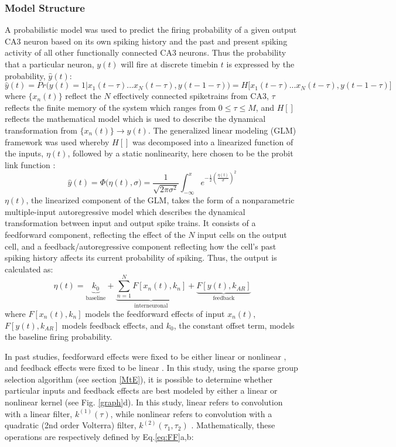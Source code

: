 \documentclass[11pt,a4paper,final]{article}
\begin{document}
\subsubsection{Model Structure \label{MtC}}
A probabilistic model was used to predict the firing probability of a given output CA3 neuron based on its own spiking history and the past and present spiking activity of all other functionally connected CA3 neurons.
Thus the probability that a particular neuron, $y(t)$ will fire at discrete timebin $t$ is expressed by the probability, $\hat{y}(t)$:
\begin{equation}
\hat{y}(t)=Pr\Big(y(t)=1|x_1(t-\tau)...x_{N}(t-\tau),y(t-1-\tau)\Big)=H\Big[x_1(t-\tau)...x_{N}(t-\tau),y(t-1-\tau)\Big]
\label{eq:prob}
\end{equation}
where $\{x_n(t)\}$ reflect the $N$ effectively connected spiketrains from CA3, $\tau$ reflects the finite memory of the system which ranges from $0 \leq \tau \leq M$, and $H[]$ reflects the mathematical model which is used to describe the dynamical transformation from $\{x_n(t)\}\to y(t)$.
The generalized linear modeling (GLM) framework was used whereby $H[]$ was decomposed into a linearized function of the inputs, $\eta(t)$, followed by a static nonlinearity, here chosen to be the probit link function \citep{truccolo05,song07}:
\begin{equation}
\hat{y}(t)=\Phi\Big(\eta(t),\sigma\Big)=\frac{1}{\sqrt{2\pi\sigma^2}}\int_{-\infty}^xe^{-\frac{1}{2}(\frac{\eta(t)}{\sigma})^2}
\label{eq:GLM}
\end{equation}
$\eta(t)$, the linearized component of the GLM, takes the form of a nonparametric multiple-input autoregressive model which describes the dynamical transformation between input and output spike trains.
It consists of a feedforward component, reflecting the effect of the $N$ input cells on the output cell, and a feedback/autoregressive component reflecting how the cell's past spiking history affects its current probability of spiking. Thus, the output is calculated as:
\begin{equation}
\eta(t)=\underbrace{k_0}_\text{baseline}+\underbrace{\sum_{n=1}^{N}F[x_n(t),k_n]}_\text{interneuronal}+
\underbrace{F[y(t),k_{AR}]}_\text{feedback}
\label{eq:MVAR}
\end{equation}
where $F[x_n(t),k_n]$ models the feedforward effects of input $x_n(t)$, $F[y(t),k_{AR}]$ models feedback effects, and $k_0$, the constant offset term, models the baseline firing probability.

In past studies, feedforward effects were fixed to be either linear \citep{sandler14} or nonlinear \citep{sandler15,song07}, and feedback effects were fixed to be linear \citep{song07}.
In this study, using the sparse group selection algorithm (see section \ref{MtE}), it is possible to determine whether particular inputs and feedback effects are best modeled by either a linear or nonlinear kernel (see Fig. \ref{graph}d).
In this study, linear refers to convolution with a linear filter, $k^{(1)}(\tau)$, while nonlinear refers to convolution with a quadratic (2nd order Volterra) filter, $k^{(2)}(\tau_1,\tau_2)$ \citep{marm04,rajan13}.
Mathematically, these operations are respectively defined by Eq.\ref{eq:FF}a,b:
\end{document}
